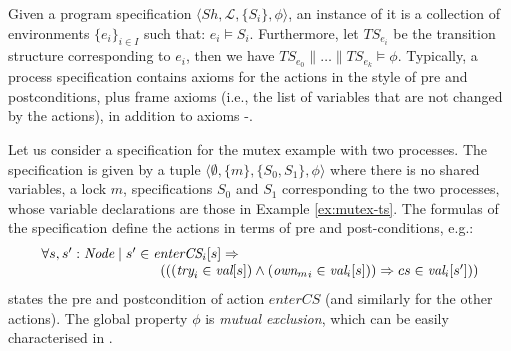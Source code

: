 	Given a program specification $\langle  Sh, \mathcal{L}, \{S_i\}, \phi  \rangle$, an instance of it is a collection of  environments 
$\{ e_i  \}_{i \in I}$ such that: $e_i \vDash S_i$. Furthermore, let $TS_{e_i}$ be the transition structure corresponding to  $e_i$, then we have $TS_{e_0} \parallel \dots \parallel TS_{e_k} \vDash \phi$. 
Typically, a process specification contains axioms for the actions in the style of pre and postconditions, plus frame axioms (i.e., the list of variables that are not changed by the actions), in addition to  axioms -. 
\begin{example} Let us consider a specification for the mutex example with two processes. The specification is given by a tuple $\langle \emptyset, \{m\}, \{ S_0, S_1 \}, \phi \rangle$ where there is no shared variables, a lock $m$, specifications $S_0$ and $S_1$ corresponding to the two processes, whose variable
declarations are those in Example \ref{ex:mutex-ts}. The formulas of the specification define the actions in terms of pre and post-conditions, e.g.:
\[
\begin{array}{l}
	\forall s,s' : \textit{Node} \mid s' \in \textit{enterCS}_i[s] \Rightarrow \\
	 \hspace*{3cm} (((\textit{try}_i \in \textit{val}[s]) \wedge ({\textit{own}_m}_i \in \textit{val}_i[s])) \Rightarrow cs \in \textit{val}_i[s']))
\end{array}
\]
states the pre and postcondition of action $\mathit{enterCS}$ (and similarly for the other actions). The global property $\phi$ is \emph{mutual exclusion}, which can be easily characterised in {\LTL}.

\end{example}
